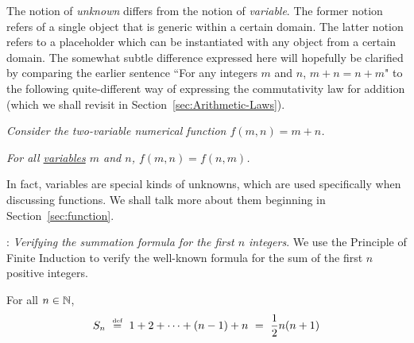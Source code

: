 \bigskip

The notion of {\it unknown} differs from the notion of {\it variable}.  The former notion refers of a single object that is generic within a certain domain.  The latter notion refers to a placeholder which can be instantiated with any object from a certain domain.  The somewhat subtle difference expressed here will hopefully be clarified by comparing the earlier sentence ``For any integers $m$ and $n$, $m + n = n + m$" to the following quite-different way of expressing the commutativity law for addition (which we shall revisit in Section~\ref{sec:Arithmetic-Laws}).

\smallskip

{\em Consider the two-variable numerical function $f(m, n) = m+n$.}

{\em  For all \underline{variables} $m$ and $n$, $f(m,n) = f(n,m)$.}

In fact, variables are special kinds of unknowns, which are used specifically when discussing functions.  We shall talk more about them beginning in Section~\ref{sec:function}.

\bigskip

:  {\it Verifying the summation formula for the first $n$ integers}.
We use the Principle of Finite Induction to verify the well-known formula for the sum of the first $n$ positive integers.

\begin{prop}
\label{thm:sum-1-to-n-induction1}
For all $n \in \mathbb{N}$,
\begin{equation}
\label{eq:sum-first-n1}
S_n \ \stackrel{\mbox{{\tiny def}}}{=} \ 1 + 2 + \cdots + (n-1) + n
        \ = \ {1 \over 2} n (n+1)
\end{equation}
\end{prop}

\bigskip

\noindent {}

